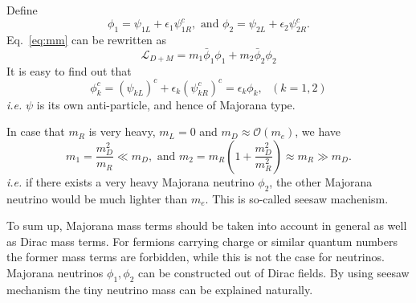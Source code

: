 Define
\begin{equation}
  \label{eq:mafi}
  \phi_{1} = \psi_{1L} + \epsilon_{1}\psi^{c}_{1R}, 
  \mbox{\ \ \ and \ \ \ }
  \phi_{2} = \psi_{2L} + \epsilon_{2}\psi^{c}_{2R}.
\end{equation}
Eq.~\ref{eq:mm} can be rewritten as
\begin{equation}
  \label{eq:mv}
  \mathcal{L}_{D+M} = m_{1}\bar{\phi}_{1}\phi_{1} + m_{2}\bar{\phi}_{2}\phi_{2}
\end{equation}
It is easy to find out that
\begin{equation}
  \label{eq:mach}
  \phi^{c}_{k} = (\psi_{kL})^{c} + \epsilon_{k}(\psi^{c}_{kR})^{c} = \epsilon_{k}\phi_{k}, ~~~ (k=1,2)
\end{equation}
\textit{i.e.} $\psi$ is its own anti-particle, and hence of Majorana type.

In case that $m_{R}$ is very heavy, $m_{L} = 0$ and $m_{D} \approx \mathcal{O}(m_{e})$, we have
\begin{equation}
  \label{eq:seesaw}
  m_{1} = \frac{m^{2}_{D}}{m_{R}}\ll m_{D},  \mbox{\ \ \ and \ \ \ }   m_{2} = m_{R}(1+\frac{m^{2}_{D}}{m^{2}_{R}}) \approx m_{R} \gg m_{D}.
\end{equation}
\textit{i.e.} if there exists a very heavy Majorana neutrino $\phi_2$, the other Majorana neutrino would be much lighter than $m_e$. This is so-called seesaw machenism.

To sum up, Majorana mass terms should be taken into account in general as well as Dirac mass terms. For fermions carrying charge or similar quantum numbers the former mass terms are forbidden, while this is not the case for neutrinos. Majorana neutrinos $\phi_{1}, \phi_{2}$ can be constructed out of Dirac fields. By using seesaw mechanism the tiny neutrino mass can be explained naturally.

